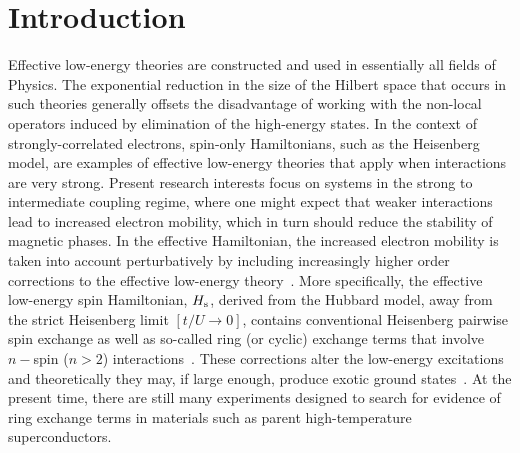 \documentclass[aps,prb,twocolumn,superscriptaddress,
               amsmath]{revtex4}
\renewcommand{\=}{\,=\,}
\newcommand{\+}{\,+\,}
\renewcommand{\-}{\,-\,}
\begin{document}
\maketitle





\section{Introduction}
Effective low-energy theories are constructed and used
in essentially all
fields of Physics. The exponential reduction in the size of the
Hilbert space that occurs in  such theories generally offsets the
disadvantage of working with the non-local operators induced by
elimination of the high-energy states. In the context of
strongly-correlated electrons, spin-only Hamiltonians, such as the
Heisenberg model, are examples of effective low-energy theories
that apply when interactions are very strong. Present research
interests focus on systems in the strong to
intermediate coupling regime,
where one might expect that weaker interactions lead to increased
electron mobility, which in turn should reduce the stability of
magnetic phases. In the effective Hamiltonian, the increased
electron mobility is taken into account perturbatively by
including increasingly higher order corrections to the effective
low-energy theory~\cite{Harris,MacDonald,Chernyshev}. More specifically,
the effective low-energy spin Hamiltonian, $H_{\rm s}$, derived
from the Hubbard model, 
away from the strict Heisenberg limit $[t/U \rightarrow 0]$, contains
conventional Heisenberg pairwise spin exchange as well as
so-called ring (or cyclic) exchange terms that involve $n-$spin
($n>2$) interactions~\cite{MacDonald,taka}. These corrections alter the
low-energy excitations and theoretically they may, if large
enough, produce exotic ground states~\cite{Sandvik}. 
At the present time, there are still many experiments designed  to search for evidence of ring exchange terms in materials such as parent high-temperature superconductors\cite{Toader}.
\end{document}
